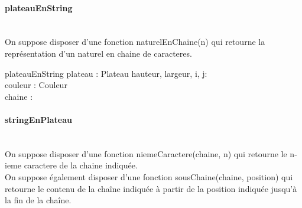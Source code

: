 \paragraph{plateauEnString}
~\\
On suppose disposer d'une fonction naturelEnChaine(n) qui retourne la représentation d'un naturel en chaine de caracteres. \\

\begin{algorithme}
\fonction
{plateauEnString}
{plateau : Plateau}
{\chaine}
{
	hauteur, largeur, i, j: \naturel \\
	couleur : Couleur \ : \chaine
}
{
	
	
	{
		{
		}	
	}

} 
\end{algorithme}

\paragraph{stringEnPlateau} ~\\
On suppose disposer d'une fonction niemeCaractere(chaine, n) qui retourne le n-ieme caractere de la chaine indiquée. \\

On suppose également disposer d'une fonction sousChaine(chaine, position) qui retourne le contenu de la chaîne indiquée à partir de la position indiquée jusqu'à la fin de la chaîne. \\

